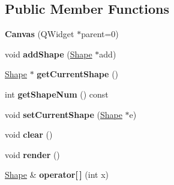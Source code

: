 \subsection*{Public Member Functions}
\begin{DoxyCompactItemize}
\item 
\mbox{\label{class_canvas_a5525075d65b32480dd518d382946e0ea}} 
{\bfseries Canvas} (Q\+Widget $\ast$parent=0)
\item 
\mbox{\label{class_canvas_a2e467a527500d7936c510db72e154ce6}} 
void {\bfseries add\+Shape} (\hyperlink{class_shape}{Shape} $\ast$add)
\item 
\mbox{\label{class_canvas_ac4bf60e8e094e90a16a4b525e89889ec}} 
\hyperlink{class_shape}{Shape} $\ast$ {\bfseries get\+Current\+Shape} ()
\item 
\mbox{\label{class_canvas_abfa07c6ffae9507dd2bff77ef26db804}} 
int {\bfseries get\+Shape\+Num} () const
\item 
\mbox{\label{class_canvas_ab973843b8722be986bb17ee02ca47488}} 
void {\bfseries set\+Current\+Shape} (\hyperlink{class_shape}{Shape} $\ast$e)
\item 
\mbox{\label{class_canvas_ac4559a6535f497f17415032632aa9f6a}} 
void {\bfseries clear} ()
\item 
\mbox{\label{class_canvas_a47b2f0b05d0aaeb93029e28cb2228746}} 
void {\bfseries render} ()
\item 
\mbox{\label{class_canvas_a96fdffb7f3f92b4522e3c320e151ac72}} 
\hyperlink{class_shape}{Shape} \& {\bfseries operator\mbox{[}$\,$\mbox{]}} (int x)
\end{DoxyCompactItemize}
